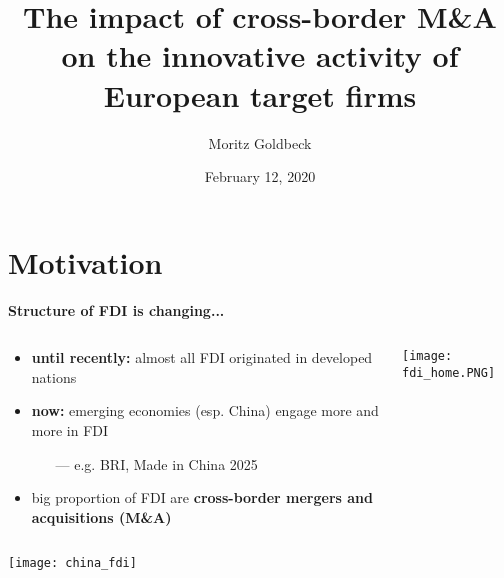 \documentclass{beamer} %
\title{\textbf{The impact of cross-border M\&A on the innovative activity of European target firms}}
\author{Moritz Goldbeck}
\institute{INTernal Seminar \\ ifo Insitute, Munich}
\date{\footnotesize February 12, 2020}
\begin{document}
	\frame[plain]{\titlepage}




\section{Motivation}

\begin{frame}{\textbf{Structure of FDI is changing...}}
	\begin{columns}
		\begin{column}{0.6\textwidth}
			\begin{itemize}
				\item \textbf{until recently:} almost all FDI originated in developed nations
				\vspace{.2cm}
				\item \textbf{now:} emerging economies (esp. China) engage more and more in FDI
				\begin{itemize}
				    \item[---] e.g. BRI, Made in China 2025
				\end{itemize}
				\vspace{.2cm}
				\item big proportion of FDI are \textbf{cross-border mergers and acquisitions (M\&A)}
			\end{itemize}
		\end{column}
		\begin{column}{0.4\textwidth}
			\texttt{[image: fdi\_home.PNG]}
		\end{column}
	\end{columns}
\end{frame}

\begin{frame}[plain]
	\texttt{[image: china\_fdi]}
\end{frame}
\end{document}
